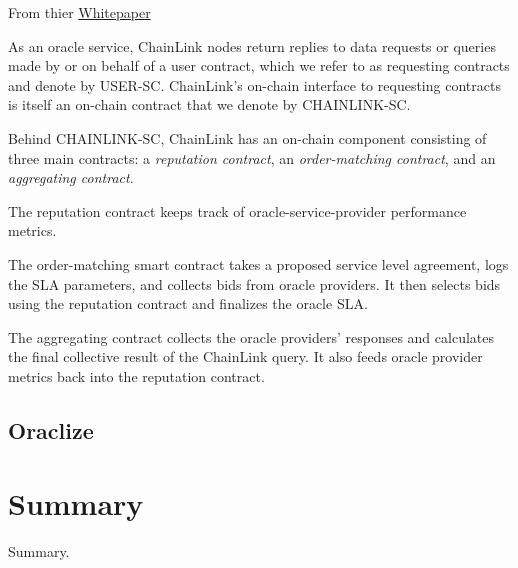 \documentclass{article}
\begin{document}
From thier \href{https://link.smartcontract.com/whitepaper}{Whitepaper}

As an oracle service, ChainLink nodes return replies to data requests or queries made
by or on behalf of a user contract, which we refer to as requesting contracts and
denote by USER-SC. ChainLink’s on-chain interface to requesting contracts is itself
an on-chain contract that we denote by CHAINLINK-SC.

Behind CHAINLINK-SC, ChainLink has an on-chain component consisting of three
main contracts: a \emph{reputation contract}, an \emph{order-matching contract},
and an \emph{aggregating contract}.

The reputation contract keeps track of oracle-service-provider performance
metrics.

The order-matching smart contract takes a proposed service level agreement,
logs the SLA parameters, and collects bids from oracle providers. It then selects bids
using the reputation contract and finalizes the oracle SLA.

The aggregating contract collects the oracle providers’ responses
and calculates the final collective result of
the ChainLink query. It also feeds oracle provider metrics back into the reputation
contract.



\subsection{Oraclize}

\section{Summary}

Summary.
\end{document}
